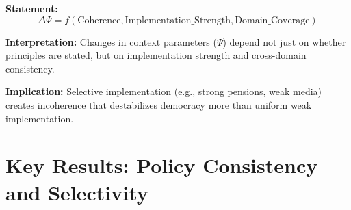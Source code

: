 \begin{tcolorbox}[colback=gray!5!white, colframe=gray!75!black,
    title=Axiom BF-2: Principle-to-Context Mapping]

\textbf{Statement:}
\begin{equation}
\Delta \Psi = f(\text{Coherence}, \text{Implementation\_Strength}, \text{Domain\_Coverage})
\end{equation}

\textbf{Interpretation:} Changes in context parameters ($\Psi$) depend not just on whether principles are stated, but on implementation strength and cross-domain consistency.

\textbf{Implication:} Selective implementation (e.g., strong pensions, weak media) creates incoherence that destabilizes democracy more than uniform weak implementation.

\end{tcolorbox}


\section{Key Results: Policy Consistency and Selectivity}
\label{sec:bf-results}

